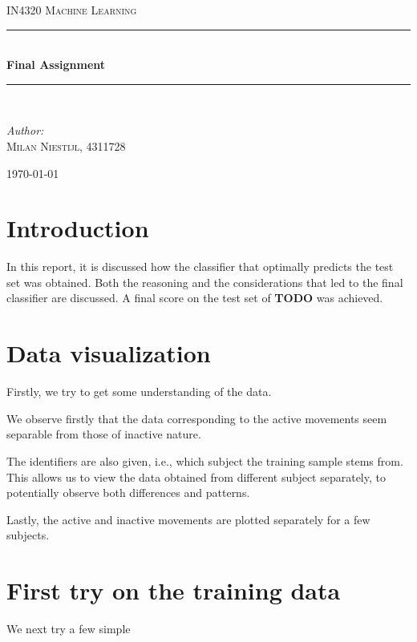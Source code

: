 \documentclass [a4paper] {report}
\begin{document}
	
	\begin{titlepage}
		\begin{center}
			
			\textsc{\LARGE IN4320 Machine Learning}\\[1.25cm]
			
			\rule{\linewidth}{0.5mm}\\[1.0cm]
			{\huge \bfseries Final Assignment }\\[0.6cm]
			\rule{\linewidth}{0.5mm}\\[1.5cm]
			
			\begin{minipage}{0.4\textwidth}
				\begin{flushleft} \large	
					\emph{Author:}\\
					\textsc{Milan Niestijl, 4311728}
				\end{flushleft}
			\end{minipage}
			
			\vfill
			{\large \today}
		\end{center}
	\end{titlepage}
	
	\section*{Introduction}
	In this report, it is discussed how the classifier that optimally predicts the test set was obtained. Both the reasoning and the considerations that led to the final classifier are discussed. A final score on the test set of \textbf{TODO} was achieved.
	
	\section*{Data visualization}
	Firstly, we try to get some understanding of the data. 
	
	

	We observe firstly that the data corresponding to the active movements seem separable from those of inactive nature. %
	
	The identifiers are also given, i.e., which subject the training sample stems from. This allows us to view the data obtained from different subject separately, to potentially observe both differences and patterns.
	
	
	Lastly, the active and inactive movements are plotted separately for a few subjects.
	
	
	\section*{First try on the training data}
	We next try a few simple
\end{document}
